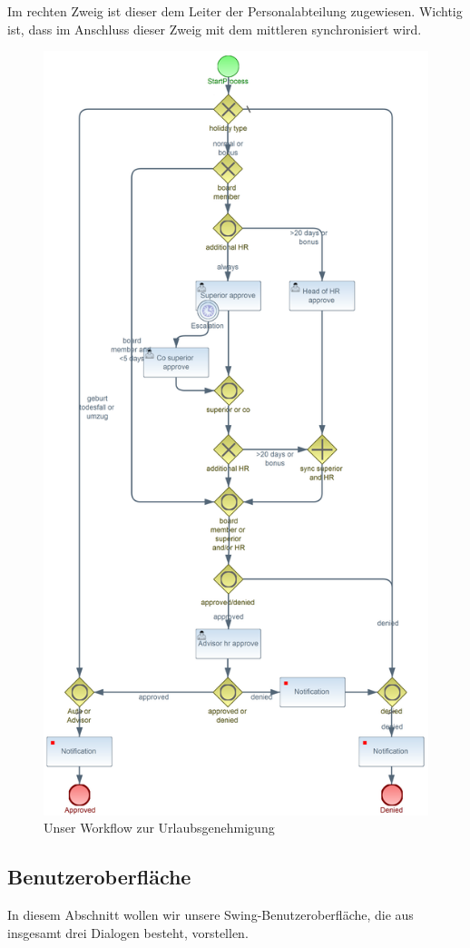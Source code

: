 Im rechten Zweig ist dieser dem Leiter der Personalabteilung zugewiesen. Wichtig ist, dass im Anschluss dieser Zweig mit dem mittleren synchronisiert wird.

\begin{figure}[H]
\centering
\includegraphics[width=0.75\linewidth]{Bilder/Urlaubsantrag}
\caption{Unser Workflow zur Urlaubsgenehmigung}
\label{fig:Urlaubsantrag}
\end{figure}


\subsection{Benutzeroberfläche}
In diesem Abschnitt wollen wir unsere Swing-Benutzeroberfläche, die aus insgesamt drei Dialogen besteht, vorstellen.

